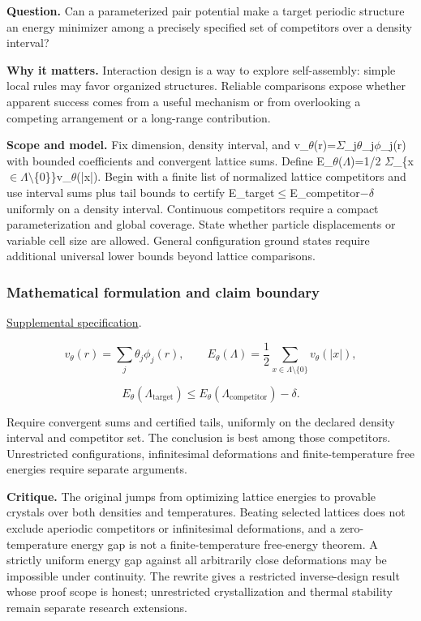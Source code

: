 \documentclass[
  11pt,
]{article}
\begin{document}
\textbf{Question.} Can a parameterized pair potential make a target
periodic structure an energy minimizer among a precisely specified set
of competitors over a density interval?

\textbf{Why it matters.} Interaction design is a way to explore
self-assembly: simple local rules may favor organized structures.
Reliable comparisons expose whether apparent success comes from a useful
mechanism or from overlooking a competing arrangement or a long-range
contribution.

\textbf{Scope and model.} Fix dimension, density interval, and
v\_\ensuremath{\theta}(r)=\ensuremath{\Sigma}\_j\ensuremath{\theta}\_j\ensuremath{\phi}\_j(r)
with bounded coefficients and convergent lattice sums. Define
E\_\ensuremath{\theta}(\ensuremath{\Lambda})=1/2
\ensuremath{\Sigma}\_\{x\ensuremath{\in}\ensuremath{\Lambda}\ensuremath{\setminus}\{0\}\}v\_\ensuremath{\theta}(|x|).
Begin with a finite list of normalized lattice competitors and use
interval sums plus tail bounds to certify
E\_target\ensuremath{\le}E\_competitor\ensuremath{-}\ensuremath{\delta}
uniformly on a density interval. Continuous competitors require a
compact parameterization and global coverage. State whether particle
displacements or variable cell size are allowed. General configuration
ground states require additional universal lower bounds beyond lattice
comparisons.

\subsubsection{Mathematical formulation and claim boundary}

\href{https://github.com/rick-stevens-ai/Pure-Thought/blob/main/supplemental/S06.md}{Supplemental
specification}.

\[v_\theta(r)=\sum_j\theta_j\phi_j(r),\qquad
E_\theta(\Lambda)=\frac12\sum_{x\in\Lambda\setminus\{0\}}v_\theta(|x|),\]

\[E_\theta(\Lambda_{\mathrm{target}})\le
E_\theta(\Lambda_{\mathrm{competitor}})-\delta.\]

Require convergent sums and certified tails, uniformly on the declared
density interval and competitor set. The conclusion is best among those
competitors. Unrestricted configurations, infinitesimal deformations and
finite-temperature free energies require separate arguments.

\textbf{Critique.} The original jumps from optimizing lattice energies
to provable crystals over both densities and temperatures. Beating
selected lattices does not exclude aperiodic competitors or
infinitesimal deformations, and a zero-temperature energy gap is not a
finite-temperature free-energy theorem. A strictly uniform energy gap
against all arbitrarily close deformations may be impossible under
continuity. The rewrite gives a restricted inverse-design result whose
proof scope is honest; unrestricted crystallization and thermal
stability remain separate research extensions.
\end{document}
